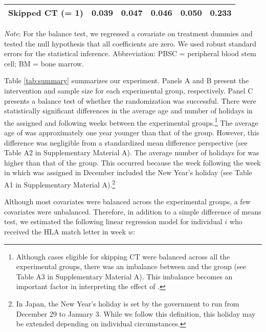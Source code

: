 \documentclass[12pt, a4paper]{article}
\newcommand{\revise}[1]{{\color{red}{#1}}}
\begin{document}
\begin{table}
\begin{threeparttable}
\begin{tabular}[t]{lccccc}
\hspace{1em}Skipped CT (= 1) & 0.039 & 0.047 & 0.046 & 0.050 & 0.233\\
\bottomrule
\end{tabular}
\begin{tablenotes}
\item \emph{Note}: For the balance test, we regressed a covariate on treatment dummies and tested the null hypothesis that all coefficients are zero. We used robust standard errors for the statistical inference. Abbreviation: PBSC = peripheral blood stem cell; BM = bone marrow.
\end{tablenotes}
\end{threeparttable}
\end{table}

Table \ref{tab:summary} summarizes our experiment. Panels A and B present the intervention and sample size for each experimental group, respectively. Panel C presents a balance test of whether the randomization was successful. There were statistically significant differences in the average age and number of holidays in the assigned and following weeks between the experimental groups.\footnote{Although cases eligible for skipping CT were balanced across all the experimental groups, there was an imbalance between \revise{the BothMessage group} and the \revise{StatusQuo} group (see Table A3 in Supplementary Material A). This imbalance becomes an important factor in interpreting the effect of \revise{the BothMessage group}.} The average age of \revise{the CoordMessage group} was approximately one year younger than that of the \revise{StatusQuo} group. However, this difference was negligible from a standardized mean difference perspective (see Table A2 in Supplementary Material A). The average number of holidays for \revise{the MatchMessage group} was higher than that of the \revise{StatusQuo} group. This occurred because the week following the week in which \revise{the MatchMessage group} was assigned in December included the New Year's holiday (see Table A1 in Supplementary Material A).\footnote{In Japan, the New Year's holiday is set by the government to run from December 29 to January 3. While we follow this definition, this holiday may be extended depending on individual circumstances.}

Although most covariates were balanced across the experimental groups, a few covariates were unbalanced. Therefore, in addition to a simple difference of means test, we estimated the following linear regression model for individual \(i\) who received the HLA match letter in week \(w\):
\end{document}
